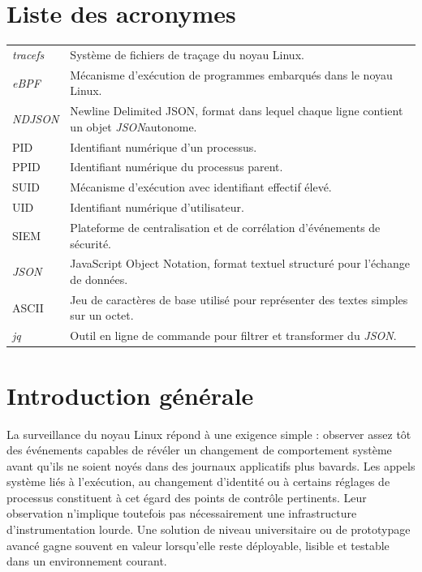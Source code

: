 \documentclass[12pt,a4paper]{report}
\newcommand{\tracefs}{\textit{tracefs}}
\newcommand{\ebpf}{\textit{eBPF}}
\newcommand{\ndjson}{\textit{NDJSON}}
\newcommand{\jsonfmt}{\textit{JSON}}
\newcommand{\jq}{\textit{jq}}
\begin{document}
\chapter*{Liste des acronymes}
\begin{longtable}{>{\raggedright\arraybackslash}p{3cm} >{\raggedright\arraybackslash}p{10cm}}
\tracefs & Système de fichiers de traçage du noyau Linux. \\
\ebpf & Mécanisme d’exécution de programmes embarqués dans le noyau Linux. \\
\ndjson & Newline Delimited JSON, format dans lequel chaque ligne contient un objet \jsonfmt autonome. \\
PID & Identifiant numérique d’un processus. \\
PPID & Identifiant numérique du processus parent. \\
SUID & Mécanisme d’exécution avec identifiant effectif élevé. \\
UID & Identifiant numérique d’utilisateur. \\
SIEM & Plateforme de centralisation et de corrélation d’événements de sécurité. \\
\jsonfmt & JavaScript Object Notation, format textuel structuré pour l’échange de données. \\
ASCII & Jeu de caractères de base utilisé pour représenter des textes simples sur un octet. \\
\jq & Outil en ligne de commande pour filtrer et transformer du \jsonfmt. \\
\end{longtable}

\clearpage
{}

\chapter{Introduction générale}
La surveillance du noyau Linux répond à une exigence simple : observer assez tôt des événements capables de révéler un changement de comportement système avant qu’ils ne soient noyés dans des journaux applicatifs plus bavards. Les appels système liés à l’exécution, au changement d’identité ou à certains réglages de processus constituent à cet égard des points de contrôle pertinents. Leur observation n’implique toutefois pas nécessairement une infrastructure d’instrumentation lourde. Une solution de niveau universitaire ou de prototypage avancé gagne souvent en valeur lorsqu’elle reste déployable, lisible et testable dans un environnement courant.
\end{document}
